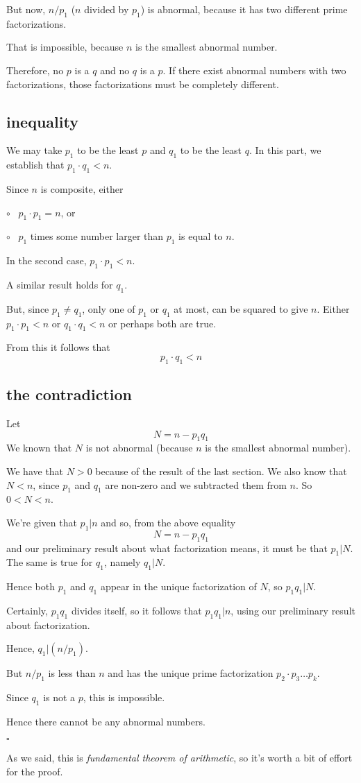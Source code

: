 \documentclass[11pt, oneside]{article}
\begin{document}
But now, $n/p_1$ ($n$ divided by $p_1$) is abnormal, because it has two different prime factorizations.  

That is impossible, because $n$ is the smallest abnormal number.

Therefore, no $p$ is a $q$ and no $q$ is a $p$.  If there exist abnormal numbers with two factorizations, those factorizations must be completely different.

\subsection*{inequality}

We may take $p_1$ to be the least $p$ and $q_1$ to be the least $q$.  In this part, we establish that $p_1 \cdot q_1 < n$.

Since $n$ is composite, either 

$\circ$ \ $p_1 \cdot p_1 = n$, or

$\circ$ \ $p_1$ times some number larger than $p_1$ is equal to $n$.

In the second case, $p_1 \cdot p_1 < n$.

A similar result holds for $q_1$.

But, since $p_1 \ne q_1$, only one of $p_1$ or $q_1$ at most, can be squared to give $n$.  Either $p_1 \cdot p_1 < n$ or $q_1 \cdot q_1 < n$ or perhaps both are true.

From this it follows that 
\[ p_1 \cdot q_1 < n \] 

\subsection*{the contradiction} 

Let 
\[ N = n - p_1 q_1 \]
We known that $N$ is not abnormal (because $n$ is the smallest abnormal number).

We have that $N > 0$ because of the result of the last section.  We also know that $N < n$, since $p_1$ and $q_1$ are non-zero and we subtracted them from $n$.  So $0 < N < n$.

We're given that $p_1 | n$ and so, from the above equality 
\[ N = n - p_1 q_1 \]
and our preliminary result about what factorization means, it must be that $p_1 | N$. The same is true for $q_1$, namely $q_1 | N$.  

Hence both $p_1$ and $q_1$ appear in the unique factorization of $N$, so $p_1q_1 | N$.

Certainly, $p_1 q_1$ divides itself, so it follows that $p_1 q_1 | n$, using our preliminary result about factorization.

Hence, $q_1| (n/p_1)$.  

But $n/p_1$ is less than $n$ and has the unique prime factorization $p_2 \cdot p_3 \dots p_k$.

Since $q_1$ is not a $p$, this is impossible.  

Hence there cannot be any abnormal numbers.

$\square$

As we said, this is \emph{fundamental theorem of arithmetic}, so it's worth a bit of effort for the proof.
\end{document}
